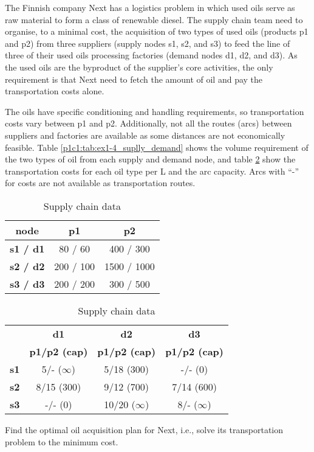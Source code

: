 The Finnish company Next has a logistics problem in which used oils serve as raw material to form a class of renewable diesel. The supply chain team need to organise, to a minimal cost, the acquisition of two types of used oils (products p1 and p2) from three suppliers (supply nodes s1, s2, and s3) to feed the line of three of their used oils processing factories (demand nodes d1, d2, and d3). As the used oils are the byproduct of the supplier's core activities, the only requirement is that Next need to fetch the amount of oil and pay the transportation costs alone.

The oils have specific conditioning and handling requirements, so transportation costs vary between p1 and p2. Additionally, not all the routes (arcs) between suppliers and factories are available as some distances are not economically feasible. Table \ref{p1c1:tab:ex1-4_suplly_demand} shows the volume requirement of the two types of oil from each supply and demand node, and table \ref{p1c1:tab:ex1-4_arcs} show the transportation costs for each oil type per L and the arc capacity. Arcs with ``-'' for costs are not available as transportation routes.

\begin{table}[h!]
	\begin{subtable}[h]{0.4\textwidth}
		\begin{center}
		\begin{tabular}{c|cc}
			\textbf{node} & \textbf{p1} & \textbf{p2} \\
			\hline
			\textbf{s1 / d1} & 80 / 60 & 400 / 300 \\
			\textbf{s2 / d2} & 200 / 100 & 1500 / 1000 \\
			\textbf{s3 / d3} & 200 / 200 & 300 / 500 \\
		\end{tabular}
		\end{center}
		\caption{Supply availability and demand per oil type [in L]}
		\label{p1c1:tab:ex1-4_suplly_demand}
	\end{subtable}
	\hfill
	\begin{subtable}[h]{0.55\textwidth}
		\begin{center}
			\begin{tabular}{c|ccc}
				 & \textbf{d1} & \textbf{d2} & \textbf{d3}\\
				 & \textbf{p1/p2 (cap)} & \textbf{p1/p2 (cap)} & \textbf{p1/p2 (cap)}\\
				\hline
				\textbf{s1} & 5/- ($\infty$) & 5/18 (300) & -/- (0)\\
				\textbf{s2} & 8/15 (300) & 9/12 (700) & 7/14 (600)\\
				\textbf{s3} & -/- (0) & 10/20 ($\infty$) & 8/- ($\infty$)\\
			\end{tabular}
		\end{center}
		\caption{Arcs costs per oil type [in \euro \ per L] and arc capacities [in L]}
		\label{p1c1:tab:ex1-4_arcs}
	\end{subtable}
	\caption{Supply chain data}
\end{table}

Find the optimal oil acquisition plan for Next, i.e., solve its transportation problem to the minimum cost.
